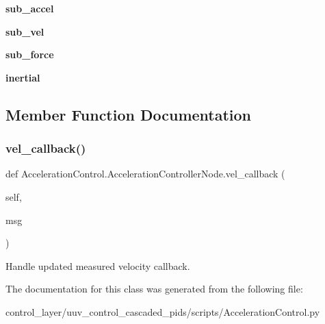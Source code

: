 \begin{DoxyCompactItemize}
{\bfseries sub\+\_\+accel}
\item 
\mbox{\label{classAccelerationControl_1_1AccelerationControllerNode_a2b446b36088aac7811417b9e397d48a6}} 
{\bfseries sub\+\_\+vel}
\item 
\mbox{\label{classAccelerationControl_1_1AccelerationControllerNode_a4e94a4783429ca78d375c0852b62a8d2}} 
{\bfseries sub\+\_\+force}
\item 
\mbox{\label{classAccelerationControl_1_1AccelerationControllerNode_afdc7b40314e2105cee24edc94aaab794}} 
{\bfseries inertial}
\end{DoxyCompactItemize}


\subsection{Member Function Documentation}
\mbox{\label{classAccelerationControl_1_1AccelerationControllerNode_ae3b309e67c7a8dc69b45c428407bb15f}} 
\subsubsection{\texorpdfstring{vel\+\_\+callback()}{vel\_callback()}}
{\footnotesize\ttfamily def Acceleration\+Control.\+Acceleration\+Controller\+Node.\+vel\+\_\+callback (\begin{DoxyParamCaption}\item[{}]{self,  }\item[{}]{msg }\end{DoxyParamCaption})}

\begin{DoxyVerb}Handle updated measured velocity callback.\end{DoxyVerb}
 

The documentation for this class was generated from the following file\+:\begin{DoxyCompactItemize}
\item 
control\+\_\+layer/uuv\+\_\+control\+\_\+cascaded\+\_\+pids/scripts/Acceleration\+Control.\+py\end{DoxyCompactItemize}
